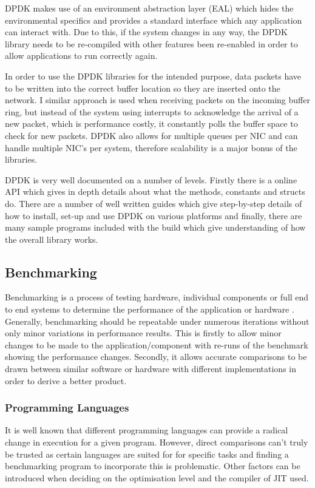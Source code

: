 \documentclass[final_report.tex]{subfiles}
\begin{document}
DPDK makes use of an environment abstraction layer (EAL) which hides the environmental specifics and provides a standard interface which any application can interact with. Due to this, if the system changes in any way, the DPDK library needs to be re-compiled with other features been re-enabled in order to allow applications to run correctly again.

In order to use the DPDK libraries for the intended purpose, data packets have to be written into the correct buffer location so they are inserted onto the network. I similar approach is used when receiving packets on the incoming buffer ring, but instead of the system using interrupts to acknowledge the arrival of a new packet, which is performance costly, it constantly polls the buffer space to check for new packets. DPDK also allows for multiple queues per NIC and can handle multiple NIC's per system, therefore scalability is a major bonus of the libraries.

DPDK is very well documented on a number of levels. Firstly there is a online API which gives in depth details about what the methods, constants and structs do. There are a number of well written guides which give step-by-step details of how to install, set-up and use DPDK on various platforms and finally, there are many sample programs included with the build which give understanding of how the overall library works.

\subsection{Benchmarking}
Benchmarking is a process of testing hardware, individual components or full end to end systems to determine the performance of the application or hardware . Generally, benchmarking should be repeatable under numerous iterations without only minor variations in performance results. This is firstly to allow minor changes to be made to the application/component with re-runs of the benchmark showing the performance changes. Secondly, it allows accurate comparisons to be drawn between similar software or hardware with different implementations in order to derive  a better product.


\subsubsection{Programming Languages}
It is well known that different programming languages can provide a radical change in execution for a given program. However, direct comparisons can't truly be trusted as certain languages are suited for for specific tasks and finding a benchmarking program to incorporate this is problematic. Other factors can be introduced when deciding on the optimisation level  and the compiler of JIT used. 
\end{document}
